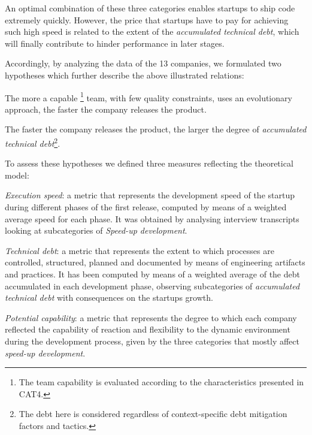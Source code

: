 \documentclass[10pt,journal,letterpaper,compsoc]{IEEEtran}
\begin{document}
An optimal combination of these three categories enables startups to ship code
extremely quickly. However, the price that startups have to pay for achieving
such high speed is related to the extent of the \textit{accumulated technical
debt}, which will finally contribute to hinder performance in later stages.


Accordingly, by analyzing the data of the 13 companies, we formulated two
hypotheses which further describe the above illustrated relations: 

\begin{compactenum} 
\item The more a capable \footnote{The team capability is
evaluated according  to the characteristics presented in CAT4.} team, with few
quality constraints,  uses an evolutionary approach, the faster the company
releases the product. 
\item The faster the company releases the product, the larger the degree of  
\textit{accumulated technical debt}\footnote{The debt here is considered  
regardless of context-specific debt mitigation factors and tactics.}. 
\end{compactenum}

To assess these hypotheses we defined three measures reflecting the theoretical
model:

\begin{compactitem}
\item \textit{Execution speed}: a metric that represents the development speed
of the startup during different phases of the first release, computed by means
of a weighted average speed for each phase. It was obtained by analysing
interview transcripts looking at subcategories of \textit{Speed-up development}.

\item \textit{Technical debt}: a metric that represents the extent to which
processes are controlled, structured, planned and documented by means of
engineering artifacts and practices. It has been computed by means of a weighted
average of the debt accumulated in each development phase, observing
subcategories of  \textit{accumulated technical debt} with consequences on the
startups growth.

\item \textit{Potential capability}: a metric that represents the degree to
which each company reflected the capability of reaction and flexibility to the
dynamic environment during the development process, given by the three
categories that mostly affect \textit{speed-up development}. 
\end{compactitem}
\end{document}
